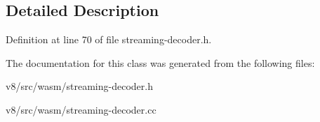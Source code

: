 \subsection{Detailed Description}


Definition at line 70 of file streaming-\/decoder.\+h.



The documentation for this class was generated from the following files\+:\begin{DoxyCompactItemize}
\item 
v8/src/wasm/streaming-\/decoder.\+h\item 
v8/src/wasm/streaming-\/decoder.\+cc\end{DoxyCompactItemize}
